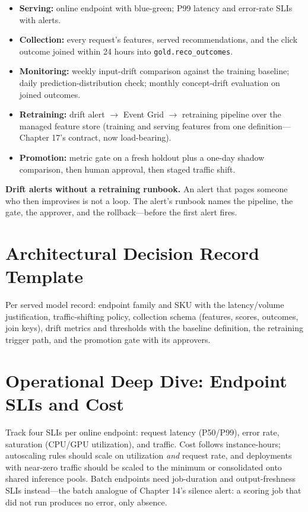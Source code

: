 \begin{itemize}
    \item \textbf{Serving:} online endpoint with blue-green; P99 latency and error-rate SLIs with alerts.
    \item \textbf{Collection:} every request's features, served recommendations, and the click outcome joined within 24 hours into \texttt{gold.reco\_outcomes}.
    \item \textbf{Monitoring:} weekly input-drift comparison against the training baseline; daily prediction-distribution check; monthly concept-drift evaluation on joined outcomes.
    \item \textbf{Retraining:} drift alert $\rightarrow$ Event Grid $\rightarrow$ retraining pipeline over the managed feature store (training and serving features from one definition---Chapter 17's contract, now load-bearing).
    \item \textbf{Promotion:} metric gate on a fresh holdout plus a one-day shadow comparison, then human approval, then staged traffic shift.
\end{itemize}

\begin{pitfall}
\textbf{Drift alerts without a retraining runbook.} An alert that pages someone who then improvises is not a loop. The alert's runbook names the pipeline, the gate, the approver, and the rollback---before the first alert fires.
\end{pitfall}

\section{Architectural Decision Record Template}
Per served model record: endpoint family and SKU with the latency/volume justification, traffic-shifting policy, collection schema (features, scores, outcomes, join keys), drift metrics and thresholds with the baseline definition, the retraining trigger path, and the promotion gate with its approvers.

\section{Operational Deep Dive: Endpoint SLIs and Cost}
Track four SLIs per online endpoint: request latency (P50/P99), error rate, saturation (CPU/GPU utilization), and traffic. Cost follows instance-hours; autoscaling rules should scale on utilization \emph{and} request rate, and deployments with near-zero traffic should be scaled to the minimum or consolidated onto shared inference pools. Batch endpoints need job-duration and output-freshness SLIs instead---the batch analogue of Chapter 14's silence alert: a scoring job that did not run produces no error, only absence.

